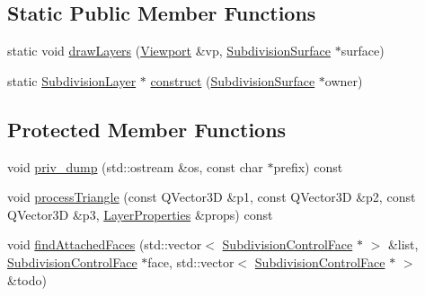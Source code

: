 \subsection*{Static Public Member Functions}
\begin{DoxyCompactItemize}
\item 
static void \hyperlink{classShipCAD_1_1SubdivisionLayer_a838537201ca31bc92a38585c87eb56e9}{draw\+Layers} (\hyperlink{classShipCAD_1_1Viewport}{Viewport} \&vp, \hyperlink{classShipCAD_1_1SubdivisionSurface}{Subdivision\+Surface} $\ast$surface)
\item 
static \hyperlink{classShipCAD_1_1SubdivisionLayer}{Subdivision\+Layer} $\ast$ \hyperlink{classShipCAD_1_1SubdivisionLayer_a7d41b9d0ff65032014ec52ff846f32a7}{construct} (\hyperlink{classShipCAD_1_1SubdivisionSurface}{Subdivision\+Surface} $\ast$owner)
\end{DoxyCompactItemize}
\subsection*{Protected Member Functions}
\begin{DoxyCompactItemize}
\item 
void \hyperlink{classShipCAD_1_1SubdivisionLayer_a80009b02c31a01e2de9f93d5982b9a63}{priv\+\_\+dump} (std\+::ostream \&os, const char $\ast$prefix) const 
\item 
void \hyperlink{classShipCAD_1_1SubdivisionLayer_ab5494ac4f4d15f3923ea8496b12c6239}{process\+Triangle} (const Q\+Vector3D \&p1, const Q\+Vector3D \&p2, const Q\+Vector3D \&p3, \hyperlink{structShipCAD_1_1LayerProperties}{Layer\+Properties} \&props) const 
\item 
void \hyperlink{classShipCAD_1_1SubdivisionLayer_abc2dc45d2e93e536cf198b31d8258201}{find\+Attached\+Faces} (std\+::vector$<$ \hyperlink{classShipCAD_1_1SubdivisionControlFace}{Subdivision\+Control\+Face} $\ast$ $>$ \&list, \hyperlink{classShipCAD_1_1SubdivisionControlFace}{Subdivision\+Control\+Face} $\ast$face, std\+::vector$<$ \hyperlink{classShipCAD_1_1SubdivisionControlFace}{Subdivision\+Control\+Face} $\ast$ $>$ \&todo)
\end{DoxyCompactItemize}
